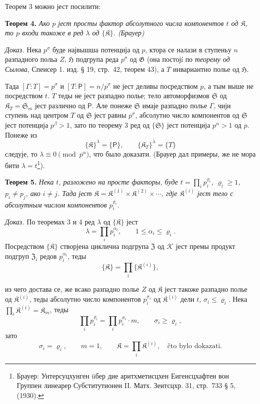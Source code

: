 \documentclass[11pt]{article}
\newcommand{\srcfn}[2]{\footnote{#2}}
\begin{document}
Теорем 3 можно јест посилити:

\textbf{Теорем 4.} \emph{Ако \(p\) јест просты фактор абсолутного числа компонентов \(t\) од \(\mathfrak K\), то \(p\) входи такоже в ред \(\lambda\) од \(\{\mathfrak K\}\). (Брауер)}

\emph{Доказ.} Нека \(p^\sigma\) буде највышша потенција од \(p\), ктора се налази в ступеньу \(n\) разпадного польа \(Z\), \(\mathfrak H\) подгрупа реда \(p^\sigma\) од \(\mathfrak G\) (она постојí по \emph{теорему од Сылова}, Спеисер 1. изд. § 19, стр.~42, теорем 43), а \(T\) инвариантно полье од \(\mathfrak H\).

Тада \([\Gamma:T]=p^\sigma\) и \([T:\mathsf P]=n/p^\sigma\) не јест деливы посредством \(p\), а тым выше не посредством \(t\). \(T\) теды не јест разпадно полье; тело автоморфизмов \(\mathfrak S\) од \(\mathfrak K_T=\mathfrak S_m\) јест различно од \(\mathsf P\). Але понеже \(\mathfrak S\) имаје разпадно полье \(\Gamma\), чији ступень над центром \(T\) од \(\mathfrak S\) јест равны \(p^\sigma\), абсолутно число компонентов од \(\mathfrak S\) јест потенција \(p^\beta>1\), зато по теорему 3 ред од \(\{\mathfrak S\}\) јест потенција \(p^\alpha>1\) од \(p\). Понеже из
\[
\{\mathfrak K\}^{\lambda}=\{\mathsf P\},
\qquad
\{\mathfrak K_T\}^{\lambda}=\{T\}
\]
следује, то \(\lambda\equiv0\pmod {p^\alpha}\), что было доказати. (Брауер дал примеры, же не мора бити \(\lambda=t\)\srcfn{1}{Брауер: Унтерсуцхунген üбер дие аритхметисцхен Еигенсцхафтен вон Группен линеарер Субститутионен II. Матх. Зеитсцхр. 31, стр.~733 § 5, (1930).}).

\textbf{Теорем 5.} \emph{Нека \(t\), разложено на просте факторы, буде \(t=\prod_i p_i^{\varrho_i}\), \(\varrho_i\ge1\), \(p_i\ne p_j\), ако \(i\ne j\). Тада јест \(\mathfrak K=\mathfrak K^{(1)}\times\mathfrak K^{(2)}\times\cdots\), гдје \(\mathfrak K^{(i)}\) јест тело с абсолутным числом компонентов \(p_i^{\varrho_i}\).}

\emph{Доказ.} По теоремах 3 и 4 ред \(\lambda\) од \(\{\mathfrak K\}\) јест
\[
\lambda=\prod_i p_i^{\alpha_i},\qquad 1\le\alpha_i\le\varrho_i.
\]
Посредством \(\{\mathfrak K\}\) створјена циклична подгрупа \(\mathfrak Z\) од \(\mathscr K\) јест премы продукт подгруп \(\mathfrak Z_i\) редов \(p_i^{\alpha_i}\), теды
\[
\{\mathfrak K\}=\prod_i\{\mathfrak K^{(i)}\},
\]

из чего достава се, же всако разпадно полье \(Z\) од \(\mathfrak K\) јест такоже разпадно полье од \(\mathfrak K^{(i)}\), теды абсолутно число компонентов \(p_i^{\sigma_i}\) од \(\mathfrak K^{(i)}\) дели \(t\), \(\sigma_i\le\varrho_i\). Нека \(\prod_i \mathfrak K^{(i)}=\mathfrak K_m\), теды
\[
\prod_i p_i^{\varrho_i}=\prod_i p_i^{\sigma_i}\cdot m,
\qquad
\sigma_i\ge\varrho_i,
\]
зато
\[
\sigma_i=\varrho_i,\qquad m=1,\qquad
\mathfrak K=\prod_i \mathfrak K^{(i)},
\quad\text{čto bylo dokazati.}
\]
\end{document}
